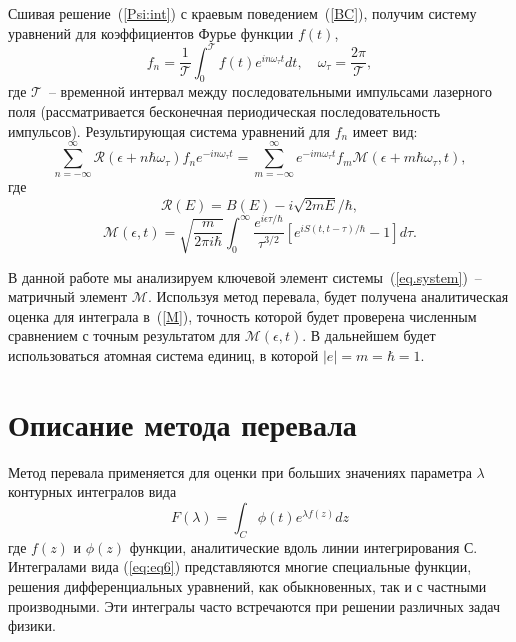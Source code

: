 \documentclass[14pt]{extarticle}
\newcommand{\sectionbreak}{\clearpage}
\newcommand{\cR}{\mathcal{R}}
\newcommand{\cM}{\mathcal{M}}
\newcommand{\cT}{\mathcal{T}}
\begin{document}
Сшивая решение~(\ref{Psi:int}) с краевым поведением~(\ref{BC}), получим систему уравнений для коэффициентов Фурье функции $f(t)$, 
\begin{equation}
\label{forier:f}
f_n=\frac{1}{\cT}\int_0^{\cT} f(t) e^{in\omega_\tau t}dt,\quad \omega_\tau = \frac{2\pi}{\cT}, 
\end{equation}
где $\cT$~-- временной интервал между последовательными импульсами лазерного поля (рассматривается бесконечная периодическая последовательность импульсов).
Результирующая система уравнений для $f_n$ имеет вид:
\begin{equation}
\label{eq.system}
\sum_{n=-\infty}^\infty \cR(\epsilon+n\hbar\omega_\tau)f_ne^{-in\omega_\tau t} = \sum_{m=-\infty}^\infty e^{-im\omega_\tau t} f_m \cM(\epsilon+m\hbar\omega_\tau,t),
\end{equation}
где
\begin{equation}
\label{R}
\cR(E) = B(E) - i\sqrt{2mE}/\hbar,
\end{equation}
\begin{equation}
\label{eq:input}
\cM(\epsilon,t) = \sqrt{\frac{m}{2\pi i\hbar}}\int_0^{\infty}
\frac{e^{i\epsilon\tau/\hbar}}{\tau^{3/2}}[e^{iS(t,t-\tau)/\hbar}-1]d\tau.
\end{equation}

В данной работе мы анализируем ключевой элемент системы~(\ref{eq.system})~-- матричный элемент $\cM$. Используя метод перевала, будет получена аналитическая оценка для интеграла в~(\ref{M}), точность которой будет проверена численным сравнением с точным результатом для $\cM(\epsilon,t)$. В дальнейшем будет использоваться атомная система единиц, в которой $|e|=m=\hbar=1$.
\sectionbreak

\section{Описание метода перевала} 

Метод перевала применяется для оценки при больших значениях параметра $\lambda$ контурных интегралов вида
\begin{equation}\label{eq:eq6}
F(\lambda) = \int_{C}^{}\phi(t)e^{\lambda f(z)}dz
\end{equation} 
где $f(z)$ и $\phi(z)$ функции, аналитические вдоль линии интегрирования С. Интегралами вида (\ref{eq:eq6}) представляются многие специальные функции, решения дифференциальных уравнений, как обыкновенных, так и с частными производными. Эти интегралы часто встречаются при решении различных задач физики.
\end{document}
